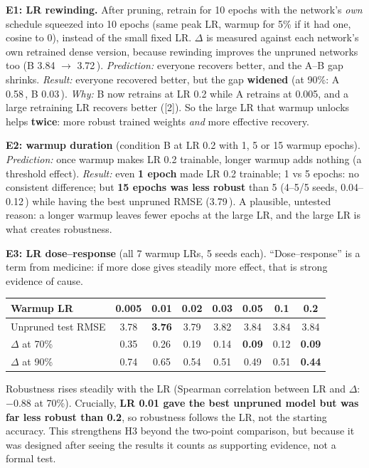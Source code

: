 \documentclass[11pt,a4paper]{article}
\newcommand{\A}{\,\text{\AA}}
\newcommand{\verdict}[1]{\fbox{\footnotesize\textbf{#1}}}
\begin{document}
\textbf{E1: LR rewinding.} After pruning, retrain for 10 epochs with the network's \emph{own} schedule squeezed into 10
epochs (same peak LR, warmup for 5\% if it had one, cosine to 0), instead of the small fixed LR. $\Delta$ is measured
against each network's own retrained dense version, because rewinding improves the unpruned networks too (B 3.84 $\to$
3.72\A).
\emph{Prediction:} everyone recovers better, and the A--B gap shrinks. \emph{Result:} everyone recovered better, but the
gap \textbf{widened} (at 90\%: A 0.58\A, B 0.03\A). \verdict{Gap prediction contradicted}
\emph{Why:} B now retrains at LR 0.2 while A retrains at 0.005, and a large retraining LR recovers better ([2]). So the
large LR that warmup unlocks helps \textbf{twice}: more robust trained weights \emph{and} more effective recovery.

\textbf{E2: warmup duration} (condition B at LR 0.2 with 1, 5 or 15 warmup epochs).
\emph{Prediction:} once warmup makes LR 0.2 trainable, longer warmup adds nothing (a threshold effect).
\emph{Result:} even \textbf{1 epoch} made LR 0.2 trainable; 1 vs 5 epochs: no consistent difference; but \textbf{15 epochs
was less robust} than 5 (4--5/5 seeds, 0.04--0.12\A) while having the best unpruned RMSE (3.79\A).
\verdict{Partly supported} A plausible, untested reason: a longer warmup leaves fewer epochs at the large LR, and the
large LR is what creates robustness.

\textbf{E3: LR dose--response} (all 7 warmup LRs, 5 seeds each). ``Dose--response'' is a term from medicine: if more
dose gives steadily more effect, that is strong evidence of cause.
\begin{center}
\small
\begin{tabular}{@{}lccccccc@{}}
\toprule
Warmup LR & 0.005 & 0.01 & 0.02 & 0.03 & 0.05 & 0.1 & 0.2 \\
\midrule
Unpruned test RMSE & 3.78 & \textbf{3.76} & 3.79 & 3.82 & 3.84 & 3.84 & 3.84 \\
$\Delta$ at 70\% & 0.35 & 0.26 & 0.19 & 0.14 & \textbf{0.09} & 0.12 & \textbf{0.09} \\
$\Delta$ at 90\% & 0.74 & 0.65 & 0.54 & 0.51 & 0.49 & 0.51 & \textbf{0.44} \\
\bottomrule
\end{tabular}
\end{center}
Robustness rises steadily with the LR (Spearman correlation between LR and $\Delta$: $-0.88$ at 70\%). Crucially,
\textbf{LR 0.01 gave the best unpruned model but was far less robust than 0.2}, so robustness follows the LR, not the
starting accuracy. This strengthens H3 beyond the two-point comparison, but because it was designed after seeing the
results it counts as supporting evidence, not a formal test.
\end{document}
